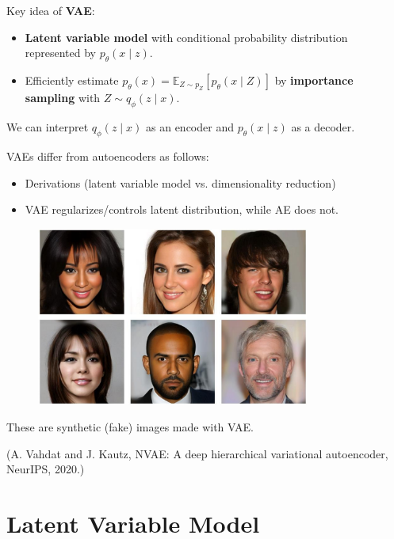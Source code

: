 \begin{concept}
    Key idea of \textbf{VAE}:

    \begin{itemize}
        \item \textbf{Latent variable model} with conditional probability distribution represented by $p_{\theta}(x \mid z)$.
        \item Efficiently estimate $p_{\theta}(x)=\mathbb{E}_{Z \sim p_{Z}}\left[p_{\theta}(x \mid Z)\right]$ by \textbf{importance sampling} with $Z \sim q_{\phi}(z \mid x)$.
    \end{itemize}

    We can interpret $q_{\phi}(z \mid x)$ as an encoder and $p_{\theta}(x \mid z)$ as a decoder.

    VAEs differ from autoencoders as follows:

    \begin{itemize}
        \item Derivations (latent variable model vs. dimensionality reduction)
        \item VAE regularizes/controls latent distribution, while AE does not.
    \end{itemize}
\end{concept}

\begin{figure}[H]
    \centering
    \includegraphics[width=0.8\textwidth]{.././assets/11.1.png}
\end{figure}

These are synthetic (fake) images made with VAE.

(A. Vahdat and J. Kautz, NVAE: A deep hierarchical variational autoencoder, NeurIPS, 2020.)

\section{Latent Variable Model}

